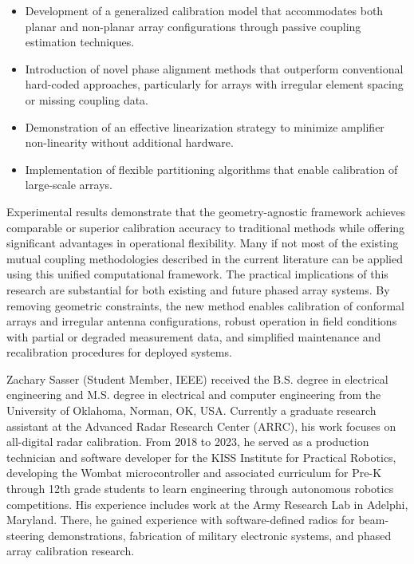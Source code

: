 \documentclass[journal]{IEEEtran}
\begin{document}
\begin{itemize}
    \item Development of a generalized calibration model that accommodates both planar and non-planar array configurations through passive coupling estimation techniques.
    \item Introduction of novel phase alignment methods that outperform conventional hard-coded approaches, particularly for arrays with irregular element spacing or missing coupling data.
    \item Demonstration of an effective linearization strategy to minimize amplifier non-linearity without additional hardware.
    \item Implementation of flexible partitioning algorithms that enable calibration of large-scale arrays.
\end{itemize}

\noindent 
Experimental results demonstrate that the geometry-agnostic framework achieves comparable or superior calibration accuracy to traditional methods while offering significant advantages in operational flexibility. Many if not most of the existing mutual coupling methodologies described in the current literature can be applied using this unified computational framework. The practical implications of this research are substantial for both existing and future phased array systems. By removing geometric constraints, the new method enables calibration of conformal arrays and irregular antenna configurations, robust operation in field conditions with partial or degraded measurement data, and simplified maintenance and recalibration procedures for deployed systems. 




\FloatBarrier
\printbibliography[heading=bibintoc,title={References}]
\begin{IEEEbiography}
{Zachary Sasser} (Student Member, IEEE) received the B.S. degree in electrical engineering and M.S. degree in electrical and computer engineering from the University of Oklahoma, Norman, OK, USA.  Currently a graduate research assistant at the Advanced Radar Research Center (ARRC), his work focuses on all-digital radar calibration. From 2018 to 2023, he served as a production technician and software developer for the KISS Institute for Practical Robotics, developing the Wombat microcontroller and associated curriculum for Pre-K through 12th grade students to learn engineering through autonomous robotics competitions. His experience includes work at the Army Research Lab in Adelphi, Maryland. There, he gained experience with software-defined radios for beam-steering demonstrations, fabrication of military electronic systems, and phased array calibration research.
\end{IEEEbiography}
\end{document}

